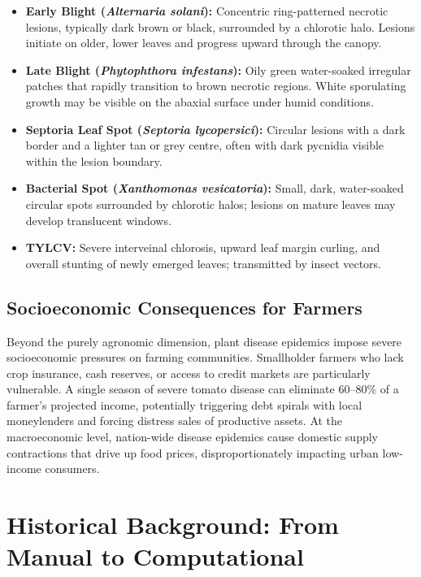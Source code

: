 \documentclass[12pt,a4paper]{report}
\begin{document}
\begin{itemize}[itemsep=4pt]
    \item \textbf{Early Blight (\textit{Alternaria solani}):} Concentric ring-patterned necrotic lesions, typically dark brown or black, surrounded by a chlorotic halo. Lesions initiate on older, lower leaves and progress upward through the canopy.
    \item \textbf{Late Blight (\textit{Phytophthora infestans}):} Oily green water-soaked irregular patches that rapidly transition to brown necrotic regions. White sporulating growth may be visible on the abaxial surface under humid conditions.
    \item \textbf{Septoria Leaf Spot (\textit{Septoria lycopersici}):} Circular lesions with a dark border and a lighter tan or grey centre, often with dark pycnidia visible within the lesion boundary.
    \item \textbf{Bacterial Spot (\textit{Xanthomonas vesicatoria}):} Small, dark, water-soaked circular spots surrounded by chlorotic halos; lesions on mature leaves may develop translucent windows.
    \item \textbf{TYLCV:} Severe interveinal chlorosis, upward leaf margin curling, and overall stunting of newly emerged leaves; transmitted by insect vectors.
\end{itemize}

\subsection{Socioeconomic Consequences for Farmers}

Beyond the purely agronomic dimension, plant disease epidemics impose severe socioeconomic pressures on farming communities. Smallholder farmers who lack crop insurance, cash reserves, or access to credit markets are particularly vulnerable. A single season of severe tomato disease can eliminate 60--80\% of a farmer's projected income, potentially triggering debt spirals with local moneylenders and forcing distress sales of productive assets. At the macroeconomic level, nation-wide disease epidemics cause domestic supply contractions that drive up food prices, disproportionately impacting urban low-income consumers.

\section{Historical Background: From Manual to Computational}
\end{document}
